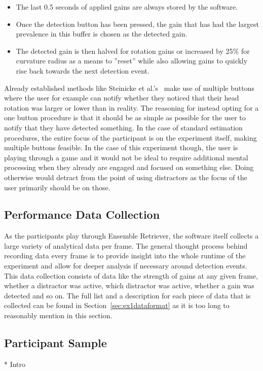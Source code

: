 \begin{itemize}
    \item The last 0.5 seconds of applied gains are always stored by the software.
    \item Once the detection button has been pressed, the gain that has had the largest prevalence in this buffer is chosen as the detected gain. 
    \item The detected gain is then halved for rotation gains or increased by 25\% for curvature radius as a means to ''reset'' while also allowing gains to quickly rise back towards the next detection event.
\end{itemize}

Already established methods like Steinicke et al.'s~\cite{5072212} make use of multiple buttons where the user for example can notify whether they noticed that their head rotation was larger or lower than in reality. The reasoning for instead opting for a one button procedure is that it should be as simple as possible for the user to notify that they have detected something. In the case of standard estimation procedures, the entire focus of the participant is on the experiment itself, making multiple buttons feasible. In the case of this experiment though, the user is playing through a game and it would not be ideal to require additional mental processing when they already are engaged and focused on something else. Doing otherwise would detract from the point of using distractors as the focus of the user primarily should be on those. 

\subsection{Performance Data Collection}
As the participants play through Ensemble Retriever, the software itself collects a large variety of analytical data per frame. The general thought process behind recording data every frame is to provide insight into the whole runtime of the experiment and allow for deeper analysis if necessary around detection events. This data collection consists of data like the strength of gains at any given frame, whether a distractor was active, which distractor was active, whether a gain was detected and so on. The full list and a description for each piece of data that is collected can be found in Section~\ref{sec:ex1dataformat} as it is too long to reasonably mention in this section.

\subsection{Participant Sample}
* Intro

